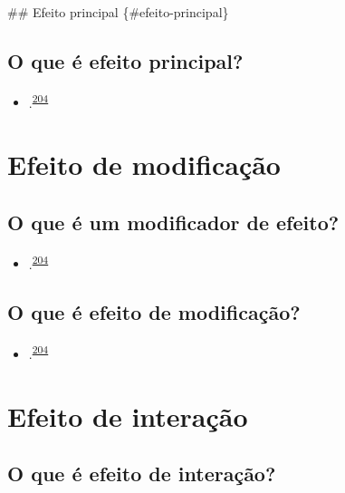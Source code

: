 \documentclass[
  a4paper,
]{book}
\providecommand{\tightlist}{%
  \setlength{\itemsep}{0pt}\setlength{\parskip}{0pt}}
\begin{document}
\#\# Efeito principal \{\#efeito-principal\}

\hypertarget{o-que-uxe9-efeito-principal}{%
\subsection{O que é efeito principal?}\label{o-que-uxe9-efeito-principal}}

\begin{itemize}
\tightlist
\item
  .\textsuperscript{\protect\hyperlink{ref-Bours2023}{204}}
\end{itemize}

\hypertarget{modificacao}{%
\section{Efeito de modificação}\label{modificacao}}

\hypertarget{o-que-uxe9-um-modificador-de-efeito}{%
\subsection{O que é um modificador de efeito?}\label{o-que-uxe9-um-modificador-de-efeito}}

\begin{itemize}
\tightlist
\item
  .\textsuperscript{\protect\hyperlink{ref-Bours2023}{204}}
\end{itemize}

\hypertarget{o-que-uxe9-efeito-de-modificauxe7uxe3o}{%
\subsection{O que é efeito de modificação?}\label{o-que-uxe9-efeito-de-modificauxe7uxe3o}}

\begin{itemize}
\tightlist
\item
  .\textsuperscript{\protect\hyperlink{ref-Bours2023}{204}}
\end{itemize}

\hypertarget{interacao}{%
\section{Efeito de interação}\label{interacao}}

\hypertarget{o-que-uxe9-efeito-de-interauxe7uxe3o}{%
\subsection{O que é efeito de interação?}\label{o-que-uxe9-efeito-de-interauxe7uxe3o}}
\end{document}

